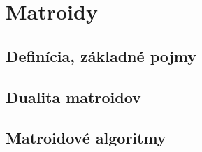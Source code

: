 \chapter{Matroidy}

\section{Definícia, základné pojmy}
\section{Dualita matroidov}
\section{Matroidové algoritmy}
